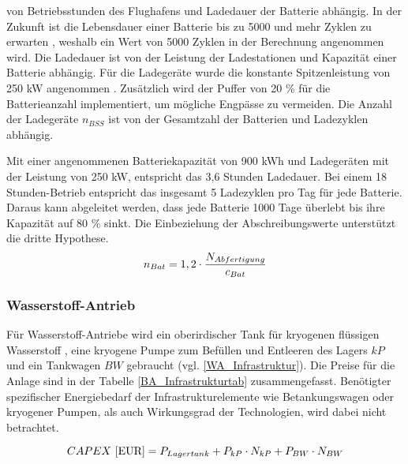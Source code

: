 von Betriebsstunden des Flughafens und Ladedauer der Batterie abhängig. 
In der Zukunft ist die Lebensdauer einer Batterie bis zu 5000 und mehr Zyklen zu erwarten \cite{reimers2018introduction}, 
weshalb ein Wert von 5000 Zyklen in der Berechnung angenommen wird.
Die Ladedauer ist von der Leistung der Ladestationen und Kapazität einer Batterie abhängig.
Für die Ladegeräte wurde die konstante Spitzenleistung von 250 kW angenommen \cite{salucci2020optimal}. 
Zusätzlich wird der Puffer von 20 \% für die Batterieanzahl implementiert, um mögliche Engpässe zu vermeiden. 
Die Anzahl der Ladegeräte $n_{BSS}$ ist von der Gesamtzahl der Batterien und Ladezyklen abhängig.

Mit einer angenommenen Batteriekapazität von 900 kWh und Ladegeräten 
mit der Leistung von 250 kW, entspricht das 3,6 Stunden Ladedauer.
Bei einem 18 Stunden-Betrieb entspricht das insgesamt 5 Ladezyklen pro Tag für jede Batterie. 
Daraus kann abgeleitet werden, dass jede Batterie 1000 Tage überlebt bis ihre Kapazität auf 80 \% sinkt.
Die Einbeziehung der Abschreibungswerte unterstützt die dritte Hypothese.
%
\begin{equation}
  {n_{Bat}} = {1,2} \cdot \frac{N_{Abfertigung}}{c_{Bat}}\\
  \label{BatAnzahl}
  \end{equation}
%
\subsubsection{Wasserstoff-Antrieb}
%

Für Wasserstoff-Antriebe wird ein oberirdischer Tank für kryogenen flüssigen Wasserstoff , 
eine kryogene Pumpe zum Befüllen und Entleeren des Lagers ${kP}$ 
und ein Tankwagen ${BW}$ gebraucht (vgl. \eqref{WA_Infrastruktur}). 
Die Preise für die Anlage sind in der Tabelle \ref{BA_Infrastrukturtab} zusammengefasst. 
%
Benötigter spezifischer Energiebedarf der Infrastrukturelemente wie Betankungswagen oder kryogener Pumpen,
als auch Wirkungsgrad der Technologien, wird dabei nicht betrachtet.

\begin{equation}
   {CAPEX ~[\text{EUR}]} = {P_{Lagertank}} + P_{kP} \cdot N_{kP} + P_{BW} \cdot N_{BW}  \\
   \label{WA_Infrastruktur}
\end{equation}

